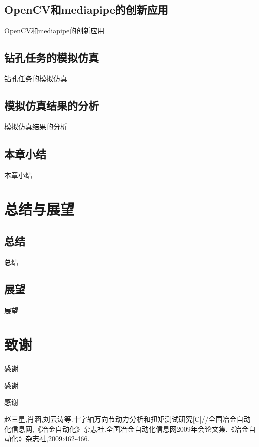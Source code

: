 \documentclass[UTF8]{article}%
\newcommand{\rf}[2]{\bibitem{#1}#2}%
\newcommand{\n}{\par}%
\begin{document}
\begin{spacing}{1.5}
	\subsection{OpenCV和mediapipe的创新应用}
	OpenCV和mediapipe的创新应用
	\subsection{钻孔任务的模拟仿真}
	钻孔任务的模拟仿真
	\subsection{模拟仿真结果的分析}
	模拟仿真结果的分析
	\subsection{本章小结}
	本章小结
\section{总结与展望}
	\subsection{总结}
	总结
	\subsection{展望}
	展望
\clearpage
\section*{致谢}
	感谢\n
	感谢\n
	感谢\n
\clearpage
{}
\begin{thebibliography}{99}
	\rf{ch01}{赵三星,肖涵,刘云涛等.十字轴万向节动力分析和扭矩测试研究[C]//全国冶金自动化信息网,《冶金自动化》杂志社.全国冶金自动化信息网2009年会论文集.《冶金自动化》杂志社,2009:462-466.}
\end{thebibliography}
\end{spacing}
\end{document}
